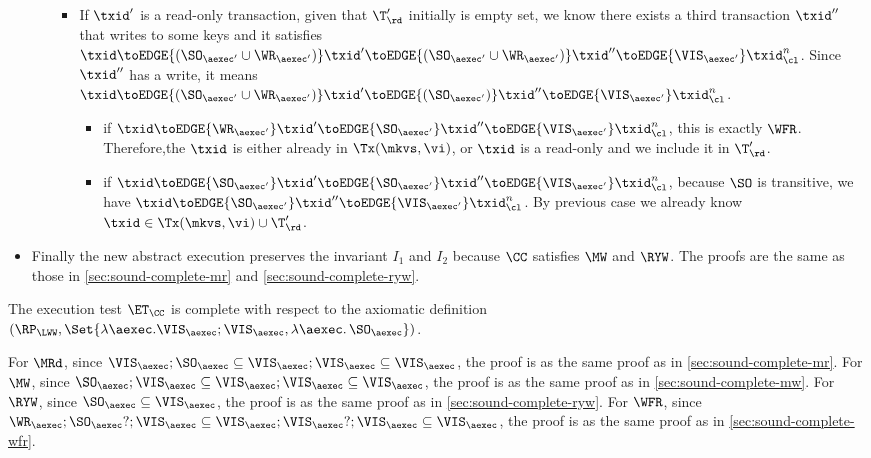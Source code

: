 \begin{itemize}
\begin{itemize}
\begin{itemize}
        \item If \( \txid' \) is a read-only transaction,
        given that \( \T'_\rd \) initially is empty set,
        we know there exists a third transaction \( \txid'' \) that writes to some keys
        and it satisfies \( \txid \toEDGE{( \SO_{\aexec'} \cup \WR_{\aexec'} )}  \txid' \toEDGE{( \SO_{\aexec'} \cup \WR_{\aexec'} )}  \txid'' \toEDGE{\VIS_{\aexec'}} \txid_\cl^n \).
        Since \( \txid'' \) has a write, it means 
        \( \txid \toEDGE{( \SO_{\aexec'} \cup \WR_{\aexec'} )}  \txid' \toEDGE{( \SO_{\aexec'} )}  \txid'' \toEDGE{\VIS_{\aexec'}} \txid_\cl^n \).
        \begin{itemize}
            \item if \( \txid \toEDGE{\WR_{\aexec'} }  \txid' \toEDGE{ \SO_{\aexec'} }  \txid'' \toEDGE{\VIS_{\aexec'}} \txid_\cl^n \),
            this is exactly \( \WFR \).
            Therefore,the \( \txid \) is either already in \( \Tx(\mkvs, \vi) \), 
            or \( \txid \) is a read-only and we include it in \( \T'_\rd \).

            \item if \( \txid \toEDGE{\SO_{\aexec'} }  \txid' \toEDGE{ \SO_{\aexec'} }  \txid'' \toEDGE{\VIS_{\aexec'}} \txid_\cl^n \),
            because \( \SO \) is transitive, we have \( \txid \toEDGE{\SO_{\aexec'}} \txid'' \toEDGE{\VIS_{\aexec'}} \txid_\cl^n \).
            By previous case we already know \( \txid \in \Tx(\mkvs, \vi) \cup \T'_\rd \).
        \end{itemize}
    \end{itemize}
    \end{itemize}
    \item Finally the new abstract execution preserves the invariant \( I_1 \) and \( I_2 \) 
    because  \( \CC \) satisfies \( \MW \) and \( \RYW \).
    The proofs are the same as those in \cref{sec:sound-complete-mr} and \cref{sec:sound-complete-ryw}.

\end{itemize}

The execution test $\ET_\CC$ is complete with respect to the axiomatic definition 
\( (\RP_{\LWW}, \Set{\lambda \aexec. \VIS_{\aexec} ; \VIS_{\aexec}, \lambda \aexec \ldotp \SO_\aexec })\).

For \( \MRd \), since \(  \VIS_\aexec ; \SO_\aexec \subseteq  \VIS_\aexec ; \VIS_{\aexec} \subseteq \VIS_\aexec \),
the proof is as the same proof as in \cref{sec:sound-complete-mr}.
For \( \MW \), since \( \SO_\aexec ; \VIS_\aexec \subseteq  \VIS_\aexec ; \VIS_{\aexec} \subseteq \VIS_\aexec \),
the proof is as the same proof as in \cref{sec:sound-complete-mw}.
For \( \RYW \), since \( \SO_\aexec \subseteq \VIS_\aexec \),
the proof is as the same proof as in \cref{sec:sound-complete-ryw}.
For \( \WFR \), since \( \WR_\aexec ; \SO_\aexec? ; \VIS_\aexec \subseteq \VIS_\aexec ; \VIS_{\aexec}? ; \VIS_\aexec \subseteq \VIS_\aexec \),
the proof is as the same proof as in \cref{sec:sound-complete-wfr}.
